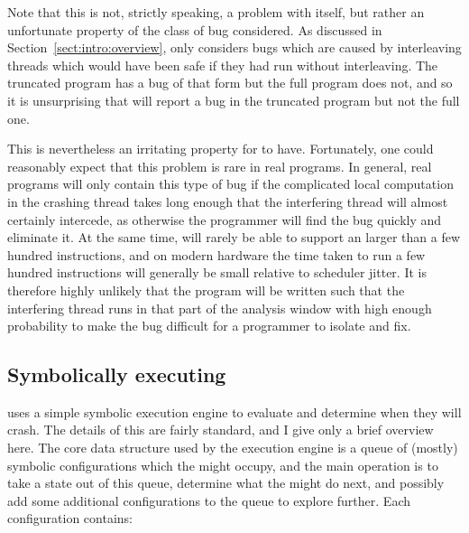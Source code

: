 Note that this is not, strictly speaking, a problem with {\technique}
itself, but rather an unfortunate property of the class of bug
considered.  As discussed in Section~\ref{sect:intro:overview},
{\technique} only considers bugs which are caused by interleaving
threads which would have been safe if they had run without
interleaving.  The truncated program has a bug of that form but the
full program does not, and so it is unsurprising that {\technique}
will report a bug in the truncated program but not the full one.

This is nevertheless an irritating property for {\technique} to have.
Fortunately, one could reasonably expect that this problem is rare in
real programs.  In general, real programs will only contain this type
of bug if the complicated local computation in the crashing thread
takes long enough that the interfering thread will almost certainly
intercede, as otherwise the programmer will find the bug quickly and
eliminate it.  At the same time, {\technique} will rarely be able to
support an  larger than a few hundred
instructions, and on modern hardware the time taken to run a few
hundred instructions will generally be small relative to scheduler
jitter.  It is therefore highly unlikely that the program will be
written such that the interfering thread runs in that part of the
analysis window with high enough probability to make the bug difficult
for a programmer to isolate and fix.  


\subsection{Symbolically executing {\StateMachines}}

{\Implementation} uses a simple symbolic execution engine to evaluate
{\StateMachines} and determine when they will crash.  The details of
this are fairly standard, and I give only a brief overview
here.  The core data structure
used by the execution engine is a queue of (mostly) symbolic
configurations which the {\StateMachine} might occupy, and the main
operation is to take a state out of this queue, determine what the
{\StateMachine} might do next, and possibly add some additional
configurations to the queue to explore further.  Each configuration
contains:


